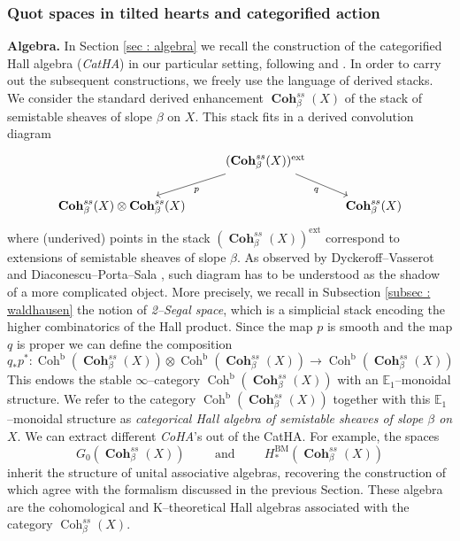 \documentclass[11pt]{article}
\newcommand{\cohbetass}{\operatorname{Coh}^{ss}_{\beta}(X)}
\newcommand{\cohbetassstack}{\boldsymbol{\operatorname{Coh}}^{ss}_{\beta}(X)}
\begin{document}
\subsubsection*{Quot spaces in tilted hearts and categorified action } 
\noindent \textbf{Algebra. }In Section \ref{sec : algebra} we recall the construction of the categorified Hall algebra (\textit{CatHA}) in our particular setting, following \cite{Porta2019TwodimensionalCH} and \cite{dps}.  In order to carry out the subsequent constructions, we freely use the language of derived stacks. We consider the standard derived enhancement $\cohbetassstack$ of the stack of semistable sheaves of slope $\beta$ on $X$. This stack fits in a derived convolution diagram
\begin{equation}\label{eqn : conv for ss in intro}
\begin{tikzcd}
	& {(\cohbetassstack)^{\operatorname{ext}}} & \\
	{\cohbetassstack \otimes \cohbetassstack} && \cohbetassstack
	\arrow["p", from=1-2, to=2-1]
	\arrow["q"', from=1-2, to=2-3]
\end{tikzcd}
\end{equation}
where (underived) points in the stack ${(\cohbetassstack)^{\operatorname{ext}}}$ correspond to extensions of semistable sheaves of slope $\beta$. As observed by Dyckeroff--Vasserot \cite{Dyckerhoff_2019} and Diaconescu--Porta--Sala \cite{dps}, such diagram has to be understood as the shadow of a more complicated object. More precisely, we recall in Subsection \ref{subsec : waldhausen} the notion of \textit{2--Segal space}, which is a simplicial stack encoding the higher combinatorics of the Hall product. Since the map $p$ is smooth and the map $q$ is proper we can define the composition 
\[
    q_*p^* \colon \operatorname{Coh}^{\operatorname{b}}(\cohbetassstack) \otimes \operatorname{Coh}^{\operatorname{b}}(\cohbetassstack) \longrightarrow \operatorname{Coh}^{\operatorname{b}}(\cohbetassstack)
\]
This endows the stable $\infty$--category $\operatorname{Coh}^{\operatorname{b}}(\cohbetassstack)$ with an $\mathbb{E}_1$--monoidal structure. We refer to the category $\operatorname{Coh}^{\operatorname{b}}(\cohbetassstack)$ together with this $\mathbb{E}_1$--monoidal structure as \textit{categorical Hall algebra of semistable sheaves of slope $\beta$ on $X$}. We can extract different \textit{CoHA}'s out of the CatHA. For example, the spaces
 \[ 
            G_0(\cohbetassstack) \hspace{1cm} \text{and} \hspace{1cm} H^{\text{BM}}_*(\cohbetassstack)
 \]
inherit the structure of unital associative algebras, recovering the construction of \cite{ss20, kapranov2022cohomologicalhallalgebrasurface, Zhao_2020} which agree with the formalism discussed in the previous Section. These algebra are the cohomological and K--theoretical Hall algebras associated with the category $\cohbetass$. \newline
\end{document}
